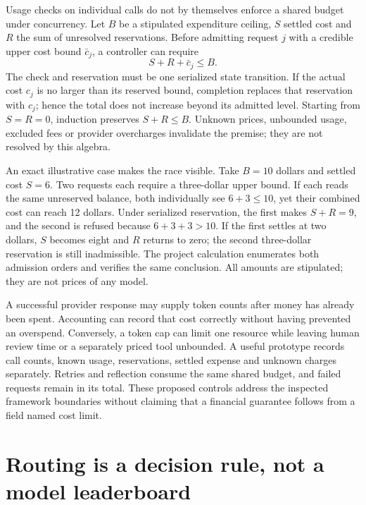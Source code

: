Usage checks on individual calls do not by themselves enforce a shared
budget under concurrency. Let $B$ be a stipulated expenditure ceiling,
$S$ settled cost and $R$ the sum of unresolved reservations. Before admitting
request $j$ with a credible upper cost bound $\bar c_j$, a controller can
require
\begin{equation}
 S+R+\bar c_j\le B.
 \label{exec14:l6-reserve}
\end{equation}
The check and reservation must be one serialized state transition. If the
actual cost $c_j$ is no larger than its reserved bound, completion replaces
that reservation with $c_j$; hence the total does not increase beyond its
admitted level. Starting from $S=R=0$, induction preserves $S+R\le B$.
Unknown prices, unbounded usage, excluded fees or provider overcharges
invalidate the premise; they are not resolved by this algebra.
\citep{exec14_l6_exact}

An exact illustrative case makes the race visible. Take $B=10$ dollars and
settled cost $S=6$. Two requests each require a three-dollar upper bound.
If each reads the same unreserved balance, both individually see
$6+3\le10$, yet their combined cost can reach 12 dollars. Under serialized
reservation, the first makes $S+R=9$, and the second is refused because
$6+3+3>10$. If the first settles at two dollars, $S$ becomes eight and $R$
returns to zero; the second three-dollar reservation is still inadmissible.
The project calculation enumerates both admission orders and verifies the
same conclusion. All amounts are stipulated; they are not prices of any
model. \citep{exec14_l6_exact}

A successful provider response may supply token counts after money has
already been spent. Accounting can record that cost correctly without
having prevented an overspend. Conversely, a token cap can limit one
resource while leaving human review time or a separately priced tool
unbounded. A useful prototype records call counts, known usage, reservations,
settled expense and unknown charges separately. Retries and reflection
consume the same shared budget, and failed requests remain in its total.
These proposed controls address the inspected framework boundaries without
claiming that a financial guarantee follows from a field named cost limit.

\section{Routing is a decision rule, not a model leaderboard}

